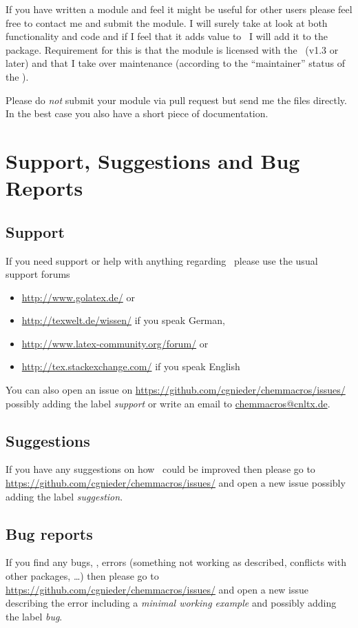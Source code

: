 \documentclass{chemmacros-manual}
\begin{document}
If you have written a module and feel it might be useful for other users
please feel free to contact me and submit the module.  I will surely take at
look at both functionality and code and if I feel that it adds value to
\chemmacros\ I will add it to the package.  Requirement for this is that the
module is licensed with the \LPPL\ (v1.3 or later) and that I take over
maintenance (according to the \enquote{maintainer} status of the \lppl).

Please do \emph{not} submit your module via pull request but send me the files
directly.  In the best case you also have a short piece of documentation.

\section{Support, Suggestions and Bug Reports}\label{sec:sugg-bug-reports}

\subsection{Support}
If you need support or help with anything regarding \chemmacros\ please use
the usual support forums
\begin{itemize}
  \item \url{http://www.golatex.de/} or
  \item \url{http://texwelt.de/wissen/} if you speak German,
  \item \url{http://www.latex-community.org/forum/} or
  \item \url{http://tex.stackexchange.com/} if you speak English
\end{itemize}
You can also open an issue on
\url{https://github.com/cgnieder/chemmacros/issues/} possibly adding the label
\emph{support} or write an email to
\href{mailto:chemmacros@cnltx.de}{chemmacros@cnltx.de}.

\subsection{Suggestions}
If you have any suggestions on how \chemmacros\ could be improved then please
go to \url{https://github.com/cgnieder/chemmacros/issues/} and open a new
issue possibly adding the label \emph{suggestion}.

\subsection{Bug reports}
If you find any bugs, \ie, errors (something not working as described,
conflicts with other packages, \ldots) then please go to
\url{https://github.com/cgnieder/chemmacros/issues/} and open a new issue
describing the error including a \emph{minimal working example} and possibly
adding the label \emph{bug}.

\printbibliography
\end{document}
